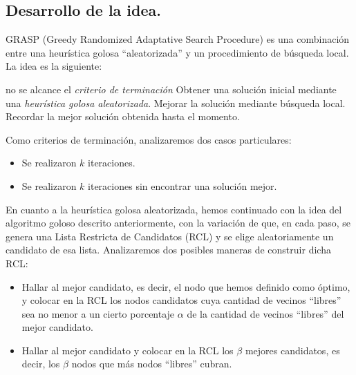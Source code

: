 \subsection{Desarrollo de la idea.}

\vspace*{0.3cm}

GRASP (Greedy Randomized Adaptative Search Procedure) es una combinación entre una heurística golosa ``aleatorizada'' y un procedimiento de búsqueda local.  La idea es la siguiente:

\begin{codebox}
\li \While no se alcance el {\it criterio de terminación}
\li \Do 
		Obtener una solución inicial mediante una {\it heurística golosa aleatorizada}.
\li 		Mejorar la solución mediante búsqueda local.
\li 		Recordar la mejor solución obtenida hasta el momento.
	\End
\end{codebox}

Como criterios de terminación, analizaremos dos casos particulares:

\begin{itemize}
\item Se realizaron $k$ iteraciones.
\item Se realizaron $k$ iteraciones sin encontrar una solución mejor.
\end{itemize}

En cuanto a la heurística golosa aleatorizada, hemos continuado con la idea del algoritmo goloso descrito anteriormente, con la variación de que, en cada paso, se genera una Lista Restricta de Candidatos (RCL) y se elige aleatoriamente un candidato de esa lista.  Analizaremos dos posibles maneras de construir dicha RCL:

\begin{itemize}
\item Hallar al mejor candidato, es decir, el nodo que hemos definido como óptimo, y colocar en la RCL los nodos candidatos cuya cantidad de vecinos ``libres'' sea no menor a un cierto porcentaje $\alpha$ de la cantidad de vecinos ``libres'' del mejor candidato.
\item Hallar al mejor candidato y colocar en la RCL los $\beta$ mejores candidatos, es decir, los $\beta$ nodos que más nodos ``libres'' cubran.
\end{itemize}

\vspace*{0.6cm}
%
%
%
%
%
%
%
